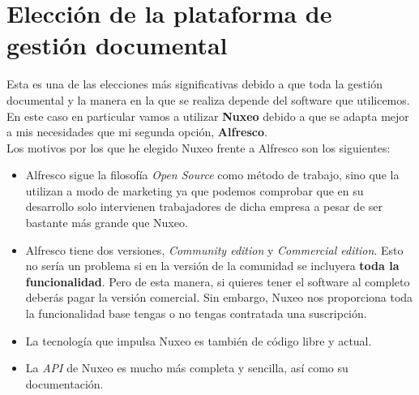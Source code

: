 \chapter{Elección de la plataforma de gestión documental}

Esta es una de las elecciones más significativas debido a que toda la gestión documental
y la manera en la que se realiza depende del software que utilicemos.
\\

En este caso en particular vamos a utilizar \textbf{Nuxeo} debido a que se adapta mejor a mis
necesidades que mi segunda opción, \textbf{Alfresco}.
\\

Los motivos por los que he elegido Nuxeo frente a Alfresco son los siguientes:

\begin{itemize}
	\item Alfresco sigue la filosofía \textit{Open Source} como método de trabajo, sino que la utilizan a modo de marketing
	 			ya que podemos comprobar que en su desarrollo solo intervienen trabajadores de dicha empresa a pesar de ser bastante
				más grande que Nuxeo.
	\item Alfresco tiene dos versiones, \textit{Community edition} y \textit{Commercial edition}. Esto no sería un problema
				si en la versión de la comunidad se incluyera \textbf{toda la funcionalidad}. Pero de esta manera, si quieres tener
				el software al completo deberás pagar la versión comercial. Sin embargo, Nuxeo nos proporciona toda la funcionalidad
				base tengas o no tengas contratada una suscripción.
	\item La tecnología que impulsa Nuxeo es también de código libre y actual.
	\item La \textit{API} de Nuxeo es mucho más completa y sencilla, así como su documentación.
\end{itemize}
